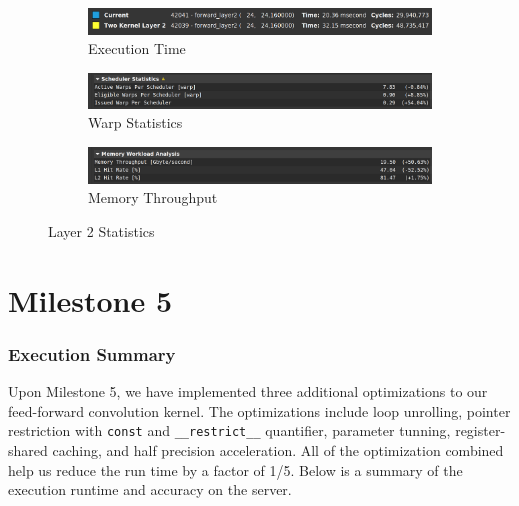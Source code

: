 \documentclass{article}
\begin{document}
\begin{figure}[H]
    \centering
    \begin{subfigure}[b]{\linewidth}
        \includegraphics[width=\linewidth]{ms4_layer2_runtime}
        \caption{Execution Time}
    \end{subfigure}
    \begin{subfigure}[b]{\linewidth}
        \includegraphics[width=\linewidth]{ms4_layer2_warp}
        \caption{Warp Statistics}
    \end{subfigure}
    \begin{subfigure}[b]{\linewidth}
        \includegraphics[width=\linewidth]{ms4_layer2_mem}
        \caption{Memory Throughput}
    \end{subfigure}
    \caption{Layer 2 Statistics}
\end{figure}

\part*{Milestone 5}
\setcounter{section}{0}

\section{Execution Summary}
Upon Milestone 5, we have implemented three additional optimizations to our feed-forward
convolution kernel. The optimizations include loop unrolling, pointer restriction with
\verb|const| and \verb|__restrict__| quantifier, parameter tunning, register-shared caching, and half precision acceleration.
All of the optimization combined help us reduce the run time by a factor of 1/5.
Below is a summary of the execution runtime and accuracy on the server.
\end{document}
